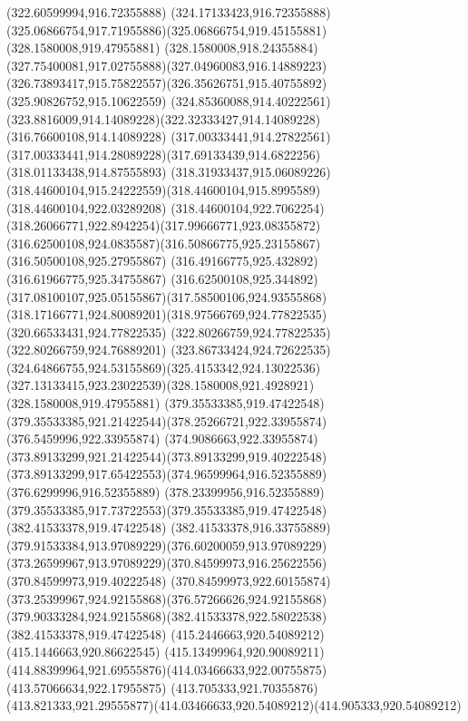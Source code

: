 {{{{				\lineto(322.60599994,916.72355888)
				\curveto(324.17133423,916.72355888)(325.06866754,917.71955886)(325.06866754,919.45155881)
				\moveto(328.1580008,919.47955881)
				\curveto(328.1580008,918.24355884)(327.75400081,917.02755888)(327.04960083,916.14889223)
				\curveto(326.73893417,915.75822557)(326.35626751,915.40755892)(325.90826752,915.10622559)
				\curveto(324.85360088,914.40222561)(323.8816009,914.14089228)(322.32333427,914.14089228)
				\lineto(316.76600108,914.14089228)
				\lineto(317.00333441,914.27822561)
				\curveto(317.00333441,914.28089228)(317.69133439,914.6822256)(318.01133438,914.87555893)
				\curveto(318.31933437,915.06089226)(318.44600104,915.24222559)(318.44600104,915.8995589)
				\lineto(318.44600104,922.03289208)
				\curveto(318.44600104,922.7062254)(318.26066771,922.8942254)(317.99666771,923.08355872)
				\curveto(316.62500108,924.0835587)(316.50866775,925.23155867)(316.50500108,925.27955867)
				\lineto(316.49166775,925.432892)
				\lineto(316.61966775,925.34755867)
				\curveto(316.62500108,925.344892)(317.08100107,925.05155867)(317.58500106,924.93555868)
				\curveto(318.17166771,924.80089201)(318.97566769,924.77822535)(320.66533431,924.77822535)
				\lineto(322.80266759,924.77822535)
				\lineto(322.80266759,924.76889201)
				\curveto(323.86733424,924.72622535)(324.64866755,924.53155869)(325.4153342,924.13022536)
				\curveto(327.13133415,923.23022539)(328.1580008,921.4928921)(328.1580008,919.47955881)
				\moveto(379.35533385,919.47422548)
				\curveto(379.35533385,921.21422544)(378.25266721,922.33955874)(376.5459996,922.33955874)
				\curveto(374.9086663,922.33955874)(373.89133299,921.21422544)(373.89133299,919.40222548)
				\curveto(373.89133299,917.65422553)(374.96599964,916.52355889)(376.6299996,916.52355889)
				\curveto(378.23399956,916.52355889)(379.35533385,917.73722553)(379.35533385,919.47422548)
				\moveto(382.41533378,919.47422548)
				\curveto(382.41533378,916.33755889)(379.91533384,913.97089229)(376.60200059,913.97089229)
				\curveto(373.26599967,913.97089229)(370.84599973,916.25622556)(370.84599973,919.40222548)
				\curveto(370.84599973,922.60155874)(373.25399967,924.92155868)(376.57266626,924.92155868)
				\curveto(379.90333284,924.92155868)(382.41533378,922.58022538)(382.41533378,919.47422548)
				\moveto(415.2446663,920.54089212)
				\lineto(415.1446663,920.86622545)
				\curveto(415.13499964,920.90089211)(414.88399964,921.69555876)(414.03466633,922.00755875)
				\lineto(413.57066634,922.17955875)
				\lineto(413.705333,921.70355876)
				\curveto(413.821333,921.29555877)(414.03466633,920.54089212)(414.905333,920.54089212)
}}}}
